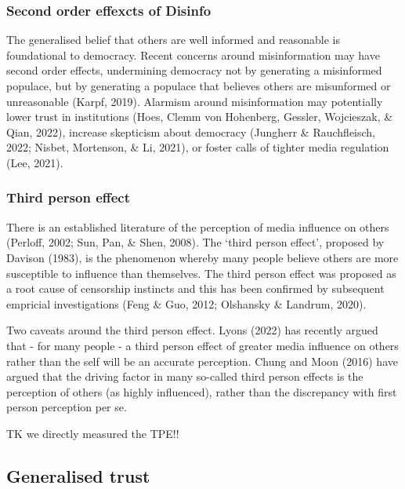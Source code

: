 \documentclass[
  ,jou,floatsintext]{apa6}
\begin{document}
\hypertarget{second-order-effexcts-of-disinfo}{%
\subsubsection{Second order effexcts of Disinfo}\label{second-order-effexcts-of-disinfo}}

The generalised belief that others are well informed and reasonable is foundational to democracy. Recent concerns around misinformation may have second order effects, undermining democracy not by generating a misinformed populace, but by generating a populace that believes others are misunformed or unreasonable (Karpf, 2019). Alarmism around misinformation may potentially lower trust in institutions (Hoes, Clemm von Hohenberg, Gessler, Wojcieszak, \& Qian, 2022), increase skepticism about democracy (Jungherr \& Rauchfleisch, 2022; Nisbet, Mortenson, \& Li, 2021), or foster calls of tighter media regulation (Lee, 2021).

\hypertarget{third-person-effect}{%
\subsubsection{Third person effect}\label{third-person-effect}}

There is an established literature of the perception of media influence on others (Perloff, 2002; Sun, Pan, \& Shen, 2008). The `third person effect', proposed by Davison (1983), is the phenomenon whereby many people believe others are more susceptible to influence than themselves. The third person effect was proposed as a root cause of censorship instincts and this has been confirmed by subsequent empricial investigations (Feng \& Guo, 2012; Olshansky \& Landrum, 2020).

Two caveats around the third person effect. Lyons (2022) has recently argued that - for many people - a third person effect of greater media influence on others rather than the self will be an accurate perception. Chung and Moon (2016) have argued that the driving factor in many so-called third person effects is the perception of others (as highly influenced), rather than the discrepancy with first person perception per se.

TK we directly measured the TPE!!

\hypertarget{generalised-trust}{%
\subsection{Generalised trust}\label{generalised-trust}}
\end{document}
